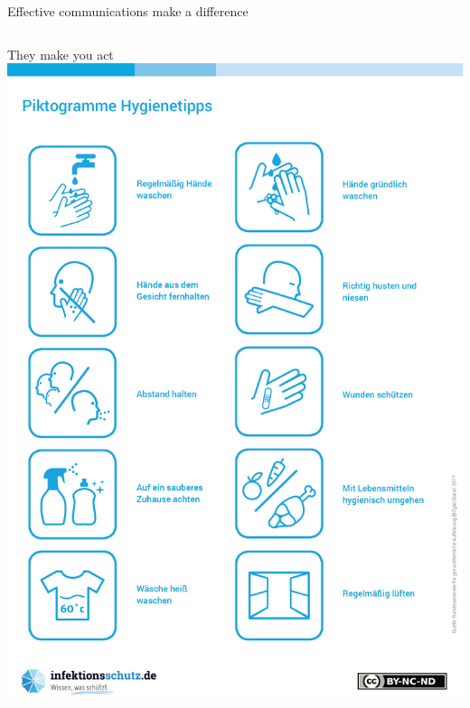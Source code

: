 \begin{frame}{Effective communications make a difference}
\begin{columns}
    \begin{column}{0.3\textwidth}
        \begin{block}{They make you act}
        \centering
            \includegraphics[width=\textwidth]{images/Piktogramme_Hygienetipps_300dpi.png}
        \end{block}

    \end{column}

\end{columns}

\end{frame}

